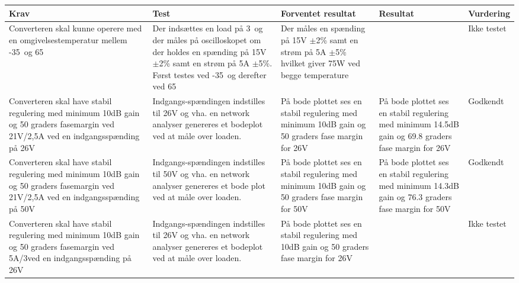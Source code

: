 \begin{tabularx}{\textwidth}{|X|X|X|X|X|}
	\hline
	\textbf{Krav} & \textbf{Test} & \textbf{Forventet resultat} & \textbf{Resultat} & \textbf{Vurdering} \\ \hline
	Converteren skal kunne operere med en omgivelsestemperatur mellem -35\degreeCelsius\ og 65\degreeCelsius\ & Der indsættes en load på 3\ohm\ og der måles på oscilloskopet om der holdes en spænding på 15V $\pm$2\% samt en strøm på 5A $\pm$5\%. Først testes ved -35\degreeCelsius\ og derefter ved 65\degreeCelsius\ & Der måles en spænding på 15V $\pm$2\% samt en strøm på 5A $\pm$5\% hvilket giver 75W ved begge temperature && Ikke testet \\ \hline
	Converteren skal have stabil regulering med minimum 10dB gain og 50 graders fasemargin ved 21V/2,5A ved en indgangsspænding på 26V & Indgangs-spændingen indstilles til 26V og vha. en network analyser genereres et bodeplot ved at måle over loaden.& På bode plottet ses en stabil regulering med minimum 10dB gain og 50 graders fase margin for 26V & På bode plottet ses en stabil regulering med minimum 14.5dB gain og 69.8 graders fase margin for 26V & Godkendt \\ \hline
	Converteren skal have stabil regulering med minimum 10dB gain og 50 graders fasemargin ved 21V/2,5A ved en indgangsspænding på 50V & Indgangs-spændingen indstilles til 50V og vha. en network analyser genereres et bode plot ved at måle over loaden. & På bode plottet ses en stabil regulering med minimum 10dB gain og 50 graders fase margin for 50V & På bode plottet ses en stabil regulering med minimum 14.3dB gain og 76.3 graders fase margin for 50V & Godkendt \\ \hline
	Converteren skal have stabil regulering med minimum 10dB gain og 50 graders fasemargin ved 5A/3\ohm ved en indgangsspænding på 26V & Indgangs-spændingen indstilles til 26V og vha. en network analyser genereres et bodeplot ved at måle over loaden.& På bode plottet ses en stabil regulering med 10dB gain og 50 graders fase margin for 26V && Ikke testet \\ \hline		
\end{tabularx}


